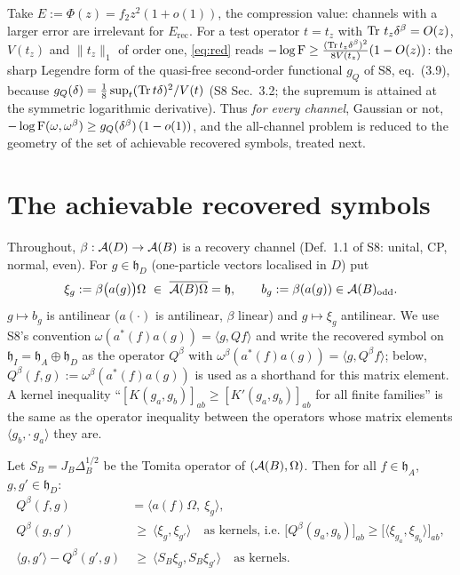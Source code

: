 \documentclass[11pt,a4paper]{article}
\newcommand{\Erec}{E_{\mathrm{rec}}}\newcommand{\Krec}{\mathcal K_{\mathrm{rec}}}
\newcommand{\hh}{\mathfrak h}\newcommand{\Var}{\operatorname{Var}}
\begin{document}
\begin{remark}\label{rem:use}
Take \(E:=\Phi(z)=f_2z^2(1+o(1))\), the compression value: channels with a larger error are
irrelevant for \(\Erec\).  For a test operator \(t=t_z\) with \(\operatorname{Tr}\,t_z\delta^\beta=O(z)\),
\(V(t_z)\) and \(\|t_z\|_1\) of order one, \eqref{eq:red} reads
\(-\log\operatorname{F}\ge\frac{(\operatorname{Tr} t_z\delta^\beta)^2}{8V(t_z)}(1-O(z))\): the sharp Legendre form of the
quasi-free second-order functional \(g_Q\) of S8, eq.~(3.9), because
\(g_Q(\delta)=\frac18\sup_t(\operatorname{Tr} t\delta)^2/V(t)\) (S8 Sec.~3.2; the supremum is attained at the
symmetric logarithmic derivative).  Thus \emph{for every channel}, Gaussian or not,
\(-\log\operatorname{F}(\omega,\omega^\beta)\ge g_Q(\delta^\beta)\,(1-o(1))\), and the all-channel problem is
reduced to the geometry of the set of achievable recovered symbols, treated next.
\end{remark}

\section{The achievable recovered symbols}\label{sec:lin}

Throughout, \(\beta:\mathcal A(D)\to\mathcal A(B)\) is a recovery channel (Def.~1.1 of S8: unital, CP,
normal, even).  For \(g\in\hh_D\) (one-particle vectors localised in \(D\)) put
\begin{equation}\label{eq:xi}
 \xi_g:=\beta\bigl(a(g)\bigr)\Omega\ \in\ \overline{\cA(B)\Omega}=\hh ,\qquad
 b_g:=\beta(a(g))\in\cA(B)_{\mathrm{odd}} .
\end{equation}
\(g\mapsto b_g\) is antilinear (\(a(\cdot)\) is antilinear, \(\beta\) linear) and \(g\mapsto\xi_g\)
antilinear.  We use S8's convention \(\omega(a^*(f)a(g))=\langle g,Qf\rangle\) and write the
recovered symbol on \(\hh_I=\hh_A\oplus\hh_D\) as the operator \(Q^\beta\) with
\(\omega^\beta(a^*(f)a(g))=\langle g,Q^\beta f\rangle\); below, \(Q^\beta(f,g):=\omega^\beta(a^*(f)a(g))\)
is used as a shorthand for this matrix element.  A kernel inequality
``\([K(g_a,g_b)]_{ab}\ge[K'(g_a,g_b)]_{ab}\) for all finite families'' is the same as the operator
inequality between the operators whose matrix elements \(\langle g_b,\cdot\,g_a\rangle\) they are.

\begin{lemma}\label{lem:gram}
Let \(S_B=J_B\Delta_B^{1/2}\) be the Tomita operator of \((\mathcal A(B),\Omega)\).  Then for all
\(f\in\hh_A\), \(g,g'\in\hh_D\):
\begin{align}
 Q^\beta(f,g)&=\langle a(f)\Omega,\ \xi_g\rangle, \label{eq:AD}\\
 Q^\beta(g,g')&\ \ge\ \langle \xi_g,\xi_{g'}\rangle\quad\text{as kernels, i.e.\ }
 \bigl[Q^\beta(g_a,g_b)\bigr]_{ab}\ge\bigl[\langle\xi_{g_a},\xi_{g_b}\rangle\bigr]_{ab}, \label{eq:gram1}\\
 \langle g,g'\rangle-Q^\beta(g',g)&\ \ge\ \langle S_B\xi_g,S_B\xi_{g'}\rangle\quad\text{as kernels}. \label{eq:gram2}
\end{align}
\end{lemma}
\end{document}
